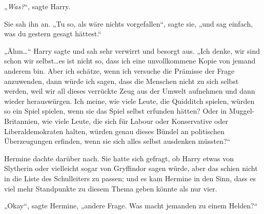 „\emph{Was?}“, sagte Harry.

Sie sah ihn an. „Tu so, als wäre nichts vorgefallen“, sagte sie, „und sag einfach, was du gestern gesagt hättest.“

„Ähm…“ Harry sagte und sah sehr verwirrt und besorgt aus. „Ich denke, wir sind schon wir selbst…es ist nicht so, dass ich eine unvollkommene Kopie von jemand anderem bin. Aber ich schätze, wenn ich versuche die Prämisse der Frage anzuwenden, dann würde ich sagen, dass die Menschen nicht zu sich selbst werden, weil wir all dieses verrückte Zeug aus der Umwelt aufnehmen und dann wieder herauswürgen. Ich meine, wie viele Leute, die Quidditch spielen, würden so ein Spiel spielen, wenn sie das Spiel selbst erfunden hätten? Oder in Muggel-Britannien, wie viele Leute, die sich für Labour oder Konservative oder Liberaldemokraten halten, würden genau dieses Bündel an politischen Überzeugungen erfinden, wenn sie sich alles selbst ausdenken müssten?“

Hermine dachte darüber nach. Sie hatte sich gefragt, ob Harry etwas von Slytherin oder vielleicht sogar von Gryffindor sagen würde, aber das schien nicht in die Liste des Schulleiters zu passen; und es kam Hermine in den Sinn, dass es viel mehr Standpunkte zu diesem Thema geben könnte als nur vier.

„Okay“, sagte Hermine, „andere Frage. Was macht jemanden zu einem Helden?“

